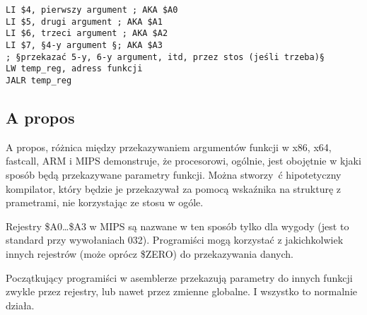 \begin{lstlisting}[caption=MIPS,style=customasmMIPS]
LI $4, pierwszy argument ; AKA $A0
LI $5, drugi argument ; AKA $A1
LI $6, trzeci argument ; AKA $A2
LI $7, §4-y argument §; AKA $A3
; §przekazać 5-y, 6-y argument, itd, przez stos (jeśli trzeba)§
LW temp_reg, adress funkcji
JALR temp_reg
\end{lstlisting}

\subsection{A propos}

A propos, różnica między przekazywaniem argumentów funkcji w x86, x64, fastcall, ARM i MIPS demonstruje, że procesorowi, ogólnie, jest obojętnie w kjaki sposób będą 
przekazywane parametry funkcji. Można stworzy ć hipotetyczny kompilator, który będzie je przekazywał za pomocą 
wskaźnika na strukturę z prametrami, nie korzystając ze stosu w ogóle.

Rejestry \$A0\dots \$A3 w MIPS są nazwane w ten sposób tylko dla wygody (jest to standard przy wywołaniach 032).
Programiści mogą korzystać z jakichkolwiek innych rejestrów (może oprócz \$ZERO) do
przekazywania danych.

Początkujący programiści w asemblerze przekazują parametry do innych funkcji
zwykle przez rejestry, lub nawet przez zmienne globalne.
I wszystko to normalnie działa.


